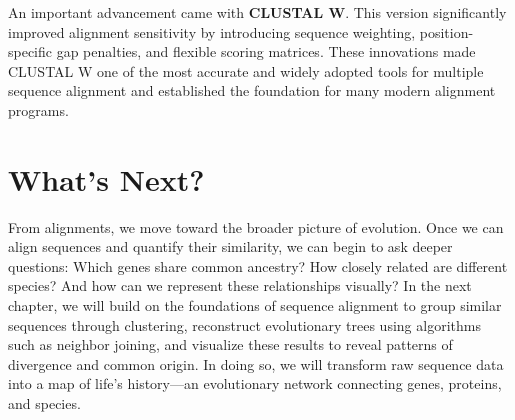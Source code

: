 An important advancement came with \textbf{CLUSTAL W}.
This version significantly improved alignment sensitivity by introducing sequence weighting, position-specific gap penalties, and flexible scoring matrices. These innovations made CLUSTAL W one of the most accurate and widely adopted tools for multiple sequence alignment and established the foundation for many modern alignment programs.

\section{What's Next?}

From alignments, we move toward the broader picture of evolution. Once we can align sequences and quantify their similarity, we can begin to ask deeper questions: Which genes share common ancestry? How closely related are different species? And how can we represent these relationships visually? In the next chapter, we will build on the foundations of sequence alignment to group similar sequences through clustering, reconstruct evolutionary trees using algorithms such as neighbor joining, and visualize these results to reveal patterns of divergence and common origin. In doing so, we will transform raw sequence data into a map of life's history—an evolutionary network connecting genes, proteins, and species.